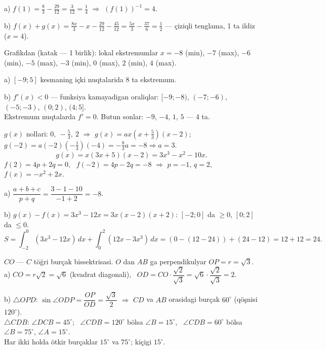 a) $f(1)=\frac83-\frac{29}{12}=\frac3{12}=\frac14$ $\Rightarrow$ $(f(1))^{-1}=4$.

b) $f(x)+g(x)=\frac{8x}3-x-\frac{29}{12}-\frac{45}{12}=\frac{5x}3-\frac{37}6=\frac12$ — çiziqli tenglama, 1 ta ildiz ($x=4$).

\newpage
{}
Grafikdan (katak — 1 birlik): lokal ekstremumlar $x=-8$ (min), $-7$ (max), $-6$ (min), $-5$ (max), $-3$ (min), $0$ (max), $2$ (min), $4$ (max).

a) $[-9;5]$ kesmaning içki nuqtalarida 8 ta ekstremum.

b) $f'(x)<0$ — funksiya kamayadigan oraliqlar: $[-9;-8)$, $(-7;-6)$, $(-5;-3)$, $(0;2)$, $(4;5]$.\\
Ekstremum nuqtalarda $f'=0$. Butun sonlar: $-9$, $-4$, $1$, $5$ — 4 ta.

\newpage
{}
$g(x)$ nollari: $0,\ -\frac53,\ 2$ $\Rightarrow$ $g(x)=ax\left(x+\frac53\right)(x-2)$; \ $g(-2)=a(-2)\left(-\frac13\right)(-4)=-\frac83a=-8\Rightarrow a=3$.
\[g(x)=x(3x+5)(x-2)=3x^3-x^2-10x.\]
$f(2)=4p+2q=0$, \ $f(-2)=4p-2q=-8$ $\Rightarrow$ $p=-1$, $q=2$, \ $f(x)=-x^2+2x$.

a) $\dfrac{a+b+c}{p+q}=\dfrac{3-1-10}{-1+2}=-8$.

b) $g(x)-f(x)=3x^3-12x=3x(x-2)(x+2)$: $[-2;0]$ da $\ge0$, $[0;2]$ da $\le0$.
\[S=\int_{-2}^0(3x^3-12x)\,dx+\int_0^2(12x-3x^3)\,dx=\left(0-(12-24)\right)+(24-12)=12+12=24.\]

\newpage
{}
$CO$ — $C$ töğri burçak bissektrisasi. $O$ dan $AB$ ga perpendikulyar $OP=r=\sqrt3$.
a) $CO=r\sqrt2=\sqrt6$ (kvadrat diagonali), \ $OD=CO\cdot\dfrac{\sqrt2}{\sqrt3}=\sqrt6\cdot\dfrac{\sqrt2}{\sqrt3}=2$.

b) $\triangle OPD$: $\sin\angle ODP=\dfrac{OP}{OD}=\dfrac{\sqrt3}2$ $\Rightarrow$ $CD$ va $AB$ orasidagi burçak $60^\circ$ (qöşnisi $120^\circ$).\\
$\triangle CDB$: $\angle DCB=45^\circ$; \ $\angle CDB=120^\circ$ bölsa $\angle B=15^\circ$, \ $\angle CDB=60^\circ$ bölsa $\angle B=75^\circ$, $\angle A=15^\circ$.\\
Har ikki holda ötkir burçaklar $15^\circ$ va $75^\circ$; kiçigi $15^\circ$.

